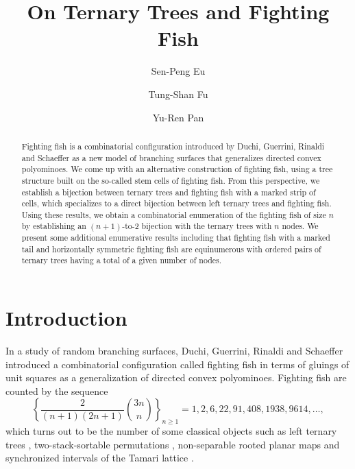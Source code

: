 \documentclass[a4paper,11pt,reqno]{amsart}
\title[]{On Ternary Trees and Fighting Fish}
\author[S.-P. Eu]{Sen-Peng Eu}
\author[T.-S. Fu]{Tung-Shan Fu}
\author[Y.-R. Pan]{Yu-Ren Pan}
\theoremstyle{definition}
\numberwithin{equation}{section}
\begin{document}
\begin{abstract}
Fighting fish is a combinatorial configuration introduced by Duchi, Guerrini, Rinaldi and Schaeffer as a new model of branching surfaces that generalizes directed convex  polyominoes. We come up with an alternative construction of fighting fish, using a tree structure built on the so-called stem cells of fighting fish. From this perspective, we establish a bijection between ternary trees and fighting fish with a marked strip of cells, which specializes to a direct bijection between left ternary trees and fighting fish. Using these results, we obtain a combinatorial enumeration of the fighting fish of size $n$ by establishing an $(n+1)$-to-2 bijection with the ternary trees with $n$ nodes. We present some additional enumerative results including that fighting fish with a marked tail and horizontally symmetric fighting fish are equinumerous with ordered pairs of ternary trees having a total of a given number of nodes.


\end{abstract}

\maketitle




\section{Introduction} \label{sec:Introduction}

In a study of random branching surfaces, Duchi, Guerrini, Rinaldi and Schaeffer \cite{DGRS-A} introduced a combinatorial configuration called fighting fish in terms of gluings of unit squares as a  generalization of directed convex polyominoes. Fighting fish are counted by the sequence \cite[A000139]{oeis} 
\begin{equation*}
\left\{\frac{2}{(n+1)(2n+1)}\binom{3n}{n}\right\}_{n\ge 1} =  1,2,6,22,91,408,1938,9614,\dots,
\end{equation*}
which turns out to be the number of some classical objects such as left ternary trees \cite{DLDRP, JS-1998}, two-stack-sortable permutations \cite{CFH, Fang-2018-2, GW-1996, West-1993, Zeil-1992}, non-separable rooted planar maps \cite{Brown, Brown-Tutte, DH-2022-A, FP-2017} and synchronized intervals of the Tamari lattice \cite{DH-2023, FP-2017}. 
\end{document}
